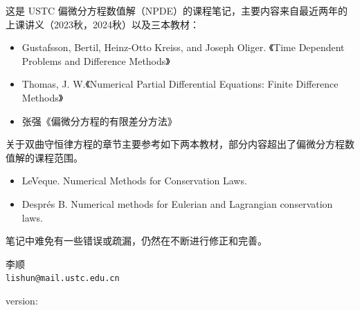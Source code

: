 这是 USTC 偏微分方程数值解（NPDE）的课程笔记，主要内容来自最近两年的上课讲义（2023秋，2024秋）以及三本教材：
\begin{itemize}
    \item Gustafsson, Bertil, Heinz-Otto Kreiss, and Joseph Oliger. 《Time Dependent Problems and Difference Methods》
    \item Thomas, J. W.《Numerical Partial Differential Equations: Finite Difference Methods》
    \item 张强《偏微分方程的有限差分方法》
\end{itemize}
关于双曲守恒律方程的章节主要参考如下两本教材，部分内容超出了偏微分方程数值解的课程范围。
\begin{itemize}
    \item LeVeque. Numerical Methods for Conservation Laws.
    \item Després B. Numerical methods for Eulerian and Lagrangian conservation laws.
\end{itemize}
笔记中难免有一些错误或疏漏，仍然在不断进行修正和完善。
\begin{flushright}
    李顺\\
    \texttt{lishun@mail.ustc.edu.cn}
\end{flushright}


\vfill
\begin{center}
    version: 
\end{center}
